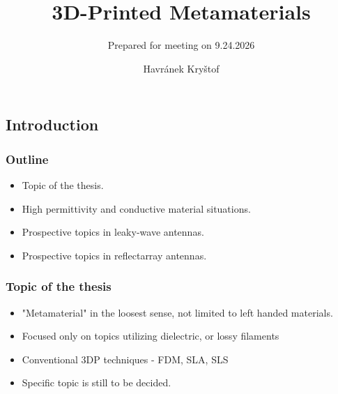 \documentclass[aspectratio=43]{beamer}
\title{3D-Printed Metamaterials}
\subtitle{Prepared for meeting on 9.24.2026}
\author{Havránek Kryštof}
\date{}
\institute{CTU, NTUST}
\begin{document}
\begin{frame}[plain]
  \maketitle
\end{frame}

\clearpage
\setcounter{framenumber}{0}

\begin{frame}[fragile]
	\section{Introduction}
  \frametitle{Outline}
  \begin{itemize}
    \item Topic of the thesis.
    \item High permittivity and conductive material situations.
    \item Prospective topics in leaky-wave antennas.
    \item Prospective topics in reflectarray antennas.
  \end{itemize}
\end{frame}

\begin{frame}[fragile]
  \frametitle{Topic of the thesis}
  \begin{itemize}
    \item "Metamaterial" in the loosest sense, not limited to left handed materials.
		\item Focused only on topics utilizing dielectric, or lossy filaments
		\item Conventional 3DP techniques - FDM, SLA, SLS
		\item Specific topic is still to be decided.
  \end{itemize}
\end{frame}
\end{document}

